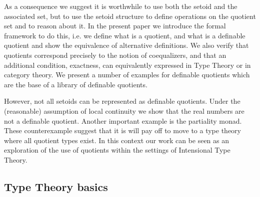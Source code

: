 \documentclass[envcountsame]{llncs}
\begin{document}
As a consequence we suggest it is worthwhile to use both the setoid
and the associated set, but to use the setoid structure to define
operations on the quotient set and to reason about it. In the present
paper we introduce the formal framework to do this, i.e. we define
what is a quotient, and what is a definable quotient and show the
equivalence of alternative definitions. We also verify that quotients
correspond precisely to the notion of coequalizers, and that an
additional condition, exactness, can equivalently expressed in Type
Theory or in category theory. We present a number of examples for
definable quotients which are the base of a library of definable
quotients. 

However, not all setoids can be represented as definable
quotients. Under the (reasonable) assumption of local continuity we
show that the real numbers are not a definable quotient. Another
important example is the partiality monad. These counterexample
suggest that it is will pay off to move to a type theory where all
quotient types exist. In this context our work can be seen as an
exploration of the use of quotients within the settings of Intensional
Type Theory.

\subsection{Type Theory basics}
\label{sec:type-theory-basics}
\end{document}
